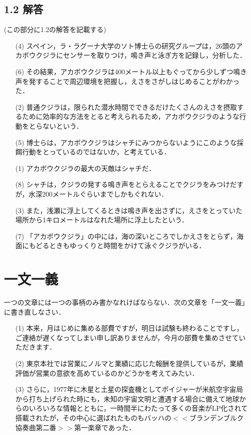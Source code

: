 \documentclass[11pt, a4paper]{jsarticle}
\begin{document}
\subsection*{1.2 解答}
(この部分に1.2の解答を記載する)
\begin{itemize}
    \item[(4)]スペイン，ラ・ラグーナ大学のソト博士らの研究グループは，26頭のアカボウクジラにセンサーを取りつけ，鳴き声と泳ぎ方を記録し，分析した．
    \item[(6)]その結果，アカボウクジラは400メートル以上もぐってから少しずつ鳴き声を発することで周辺環境を把握し，えさをさがしはじめることがわかった．
    \item[(2)]普通クジラは，限られた潜水時間でできるだけたくさんのえさを摂取するために効率的な方法をとると考えられるため，アカボウクジラのような行動をとらないという．

    \item[(5)]博士らは，アカボウクジラはシャチにみつからないようにこのような採餌行動をとっているのではないか，と考えている．
    \item[(1)]アカボウクジラの最大の天敵はシャチだ．
    \item[(8)]シャチは，クジラの発する鳴き声をとらえることでクジラをみつけだすが，水深200メートルぐらいまでしかもぐれない．

    \item[(3)]また，浅瀬に浮上してくるときは鳴き声を出さずに，えさをとっていた場所から1キロメートルはなれた場所に浮上したという．
    \item[(7)]「アカボウクジラ」の中には，海の深いところでしかえさをとらず，海面にもどるときもゆっくりと時間をかけて泳ぐクジラがいる．
\end{itemize}

\newpage
\section{一文一義}
一つの文章には一つの事柄のみ書かなれけばならない．次の文章を「一文一義」に書き直しなさい．
\begin{itemize}
\item[(1)] 本来，月はじめに集める部費ですが，明日は試験も終わることですし，ご連絡が遅くなってしまい申し訳ありませんが，今月の部費を集めさせていただきます．
\item[(2)] 東京本社では営業にノルマと業績に応じた報酬を提供しているが，業績評価が営業の意欲を高めているのかどうかを考えてみたい．
\item[(3)] さらに，1977年に木星と土星の探査機としてボイジャーが米航空宇宙局から打ち上げられた時にも，未知の宇宙文明と遭遇する場合に備えて地球からのいろいろな情報とともに，一時間半にわたって多くの音楽がLP化されて搭載されたが，その中心に選ばれたものもバッハの$<<$ブランデンブルク協奏曲第二番$>>$第一楽章であった．
\end{itemize}
\end{document}
